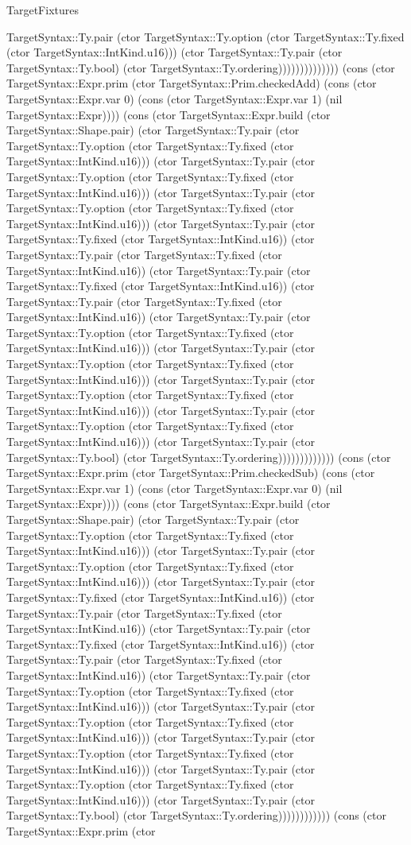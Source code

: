\begin{lexlean}{TargetFixtures}
\begin{semanticmodule}
{TargetSyntax::Ty.pair (ctor TargetSyntax::Ty.option (ctor TargetSyntax::Ty.fixed (ctor TargetSyntax::IntKind.u16))) (ctor TargetSyntax::Ty.pair (ctor TargetSyntax::Ty.bool) (ctor TargetSyntax::Ty.ordering)))))))))))))) (cons (ctor TargetSyntax::Expr.prim (ctor TargetSyntax::Prim.checkedAdd) (cons (ctor TargetSyntax::Expr.var 0) (cons (ctor TargetSyntax::Expr.var 1) (nil TargetSyntax::Expr)))) (cons (ctor TargetSyntax::Expr.build (ctor TargetSyntax::Shape.pair) (ctor TargetSyntax::Ty.pair (ctor TargetSyntax::Ty.option (ctor TargetSyntax::Ty.fixed (ctor TargetSyntax::IntKind.u16))) (ctor TargetSyntax::Ty.pair (ctor TargetSyntax::Ty.option (ctor TargetSyntax::Ty.fixed (ctor TargetSyntax::IntKind.u16))) (ctor TargetSyntax::Ty.pair (ctor TargetSyntax::Ty.option (ctor TargetSyntax::Ty.fixed (ctor TargetSyntax::IntKind.u16))) (ctor TargetSyntax::Ty.pair (ctor TargetSyntax::Ty.fixed (ctor TargetSyntax::IntKind.u16)) (ctor TargetSyntax::Ty.pair (ctor TargetSyntax::Ty.fixed (ctor TargetSyntax::IntKind.u16)) (ctor TargetSyntax::Ty.pair (ctor TargetSyntax::Ty.fixed (ctor TargetSyntax::IntKind.u16)) (ctor TargetSyntax::Ty.pair (ctor TargetSyntax::Ty.fixed (ctor TargetSyntax::IntKind.u16)) (ctor TargetSyntax::Ty.pair (ctor TargetSyntax::Ty.option (ctor TargetSyntax::Ty.fixed (ctor TargetSyntax::IntKind.u16))) (ctor TargetSyntax::Ty.pair (ctor TargetSyntax::Ty.option (ctor TargetSyntax::Ty.fixed (ctor TargetSyntax::IntKind.u16))) (ctor TargetSyntax::Ty.pair (ctor TargetSyntax::Ty.option (ctor TargetSyntax::Ty.fixed (ctor TargetSyntax::IntKind.u16))) (ctor TargetSyntax::Ty.pair (ctor TargetSyntax::Ty.option (ctor TargetSyntax::Ty.fixed (ctor TargetSyntax::IntKind.u16))) (ctor TargetSyntax::Ty.pair (ctor TargetSyntax::Ty.bool) (ctor TargetSyntax::Ty.ordering))))))))))))) (cons (ctor TargetSyntax::Expr.prim (ctor TargetSyntax::Prim.checkedSub) (cons (ctor TargetSyntax::Expr.var 1) (cons (ctor TargetSyntax::Expr.var 0) (nil TargetSyntax::Expr)))) (cons (ctor TargetSyntax::Expr.build (ctor TargetSyntax::Shape.pair) (ctor TargetSyntax::Ty.pair (ctor TargetSyntax::Ty.option (ctor TargetSyntax::Ty.fixed (ctor TargetSyntax::IntKind.u16))) (ctor TargetSyntax::Ty.pair (ctor TargetSyntax::Ty.option (ctor TargetSyntax::Ty.fixed (ctor TargetSyntax::IntKind.u16))) (ctor TargetSyntax::Ty.pair (ctor TargetSyntax::Ty.fixed (ctor TargetSyntax::IntKind.u16)) (ctor TargetSyntax::Ty.pair (ctor TargetSyntax::Ty.fixed (ctor TargetSyntax::IntKind.u16)) (ctor TargetSyntax::Ty.pair (ctor TargetSyntax::Ty.fixed (ctor TargetSyntax::IntKind.u16)) (ctor TargetSyntax::Ty.pair (ctor TargetSyntax::Ty.fixed (ctor TargetSyntax::IntKind.u16)) (ctor TargetSyntax::Ty.pair (ctor TargetSyntax::Ty.option (ctor TargetSyntax::Ty.fixed (ctor TargetSyntax::IntKind.u16))) (ctor TargetSyntax::Ty.pair (ctor TargetSyntax::Ty.option (ctor TargetSyntax::Ty.fixed (ctor TargetSyntax::IntKind.u16))) (ctor TargetSyntax::Ty.pair (ctor TargetSyntax::Ty.option (ctor TargetSyntax::Ty.fixed (ctor TargetSyntax::IntKind.u16))) (ctor TargetSyntax::Ty.pair (ctor TargetSyntax::Ty.option (ctor TargetSyntax::Ty.fixed (ctor TargetSyntax::IntKind.u16))) (ctor TargetSyntax::Ty.pair (ctor TargetSyntax::Ty.bool) (ctor TargetSyntax::Ty.ordering)))))))))))) (cons (ctor TargetSyntax::Expr.prim (ctor }
\end{semanticmodule}
\end{lexlean}
